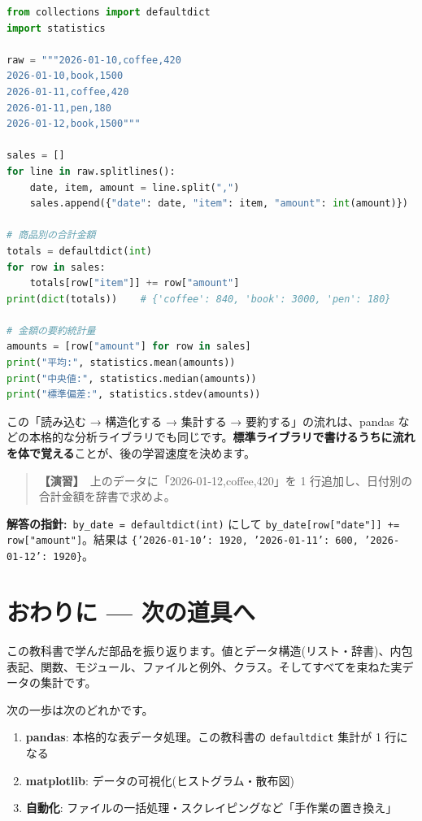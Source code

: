 \documentclass{article}
\begin{document}
\begin{lstlisting}[language=Python]
from collections import defaultdict
import statistics

raw = """2026-01-10,coffee,420
2026-01-10,book,1500
2026-01-11,coffee,420
2026-01-11,pen,180
2026-01-12,book,1500"""

sales = []
for line in raw.splitlines():
    date, item, amount = line.split(",")
    sales.append({"date": date, "item": item, "amount": int(amount)})

# 商品別の合計金額
totals = defaultdict(int)
for row in sales:
    totals[row["item"]] += row["amount"]
print(dict(totals))    # {'coffee': 840, 'book': 3000, 'pen': 180}

# 金額の要約統計量
amounts = [row["amount"] for row in sales]
print("平均:", statistics.mean(amounts))
print("中央値:", statistics.median(amounts))
print("標準偏差:", statistics.stdev(amounts))
\end{lstlisting}

この「読み込む → 構造化する → 集計する → 要約する」の流れは、pandas などの本格的な分析ライブラリでも同じです。\textbf{標準ライブラリで書けるうちに流れを体で覚える}ことが、後の学習速度を決めます。

\begin{quote}
\textbf{【演習】}\ 上のデータに「2026-01-12,coffee,420」を 1 行追加し、日付別の合計金額を辞書で求めよ。
\end{quote}

\textbf{解答の指針:}\ \texttt{by\_date = defaultdict(int)} にして \texttt{by\_date[row["date"]] += row["amount"]}。結果は \texttt{\{'2026-01-10': 1920, '2026-01-11': 600, '2026-01-12': 1920\}}。

\section{おわりに — 次の道具へ}

この教科書で学んだ部品を振り返ります。値とデータ構造(リスト・辞書)、内包表記、関数、モジュール、ファイルと例外、クラス。そしてすべてを束ねた実データの集計です。

次の一歩は次のどれかです。

\begin{enumerate}
\item \textbf{pandas}: 本格的な表データ処理。この教科書の \texttt{defaultdict} 集計が 1 行になる
\item \textbf{matplotlib}: データの可視化(ヒストグラム・散布図)
\item \textbf{自動化}: ファイルの一括処理・スクレイピングなど「手作業の置き換え」
\end{enumerate}
\end{document}
